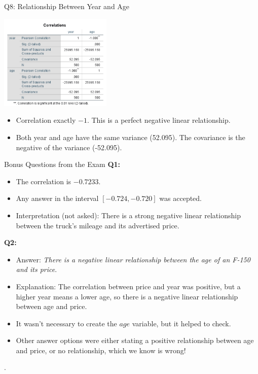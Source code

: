 \documentclass[11pt]{beamer}
\begin{document}
\begin{frame}{Q8: Relationship Between Year and Age}
  \begin{center}
    \includegraphics[width=0.4\textwidth]{f150-correlation-year-age.png}
  \end{center}
  \begin{itemize}
    \item Correlation exactly $-1$. This is a perfect negative linear relationship.
    \item Both year and age have the same variance (52.095). The covariance is the negative of the variance (-52.095).
  \end{itemize}
\end{frame}

\begin{frame}{Bonus Questions from the Exam}
  \textbf{Q1:}
  \begin{itemize}
    \item The correlation is $-0.7233$.
    \item Any answer in the interval $\left[-0.724, -0.720  \right]$ was accepted.
    \item Interpretation (not asked): There is a strong negative linear relationship between the truck's mileage and its advertised price.
  \end{itemize}
  \textbf{Q2:}
  \begin{itemize}
    \item Answer: \emph{There is a negative linear relationship between the age of an F-150 and its price}.
    \item Explanation: The correlation between price and year was positive, but a higher year means a lower age, so there is a negative linear relationship between age and price.
    \item It wasn't necessary to create the $age$ variable, but it helped to check.
    \item Other answer options were either stating a positive relationship between age and price, or no relationship, which we know is wrong!
  \end{itemize}.
\end{frame}
\end{document}

